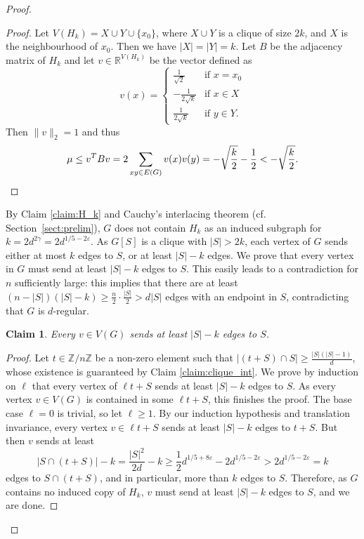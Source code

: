 \documentclass[11pt]{article}
\theoremstyle{plain}
\newtheorem{claim}[theorem]{Claim}
\theoremstyle{definition}
\newcommand{\eps}{\varepsilon}
\begin{document}
\begin{proof}
    \begin{proof}
        Let $V(H_k)=X\cup Y\cup \{x_0\}$, where $X\cup Y$ is a clique of size $2k$, and $X$ is the neighbourhood of $x_0$. Then we have $|X|=|Y|=k$. Let $B$ be the adjacency matrix of $H_k$ and let $v\in \mathbb{R}^{V(H_k)}$ be the vector defined as 
        $$v(x)=\begin{cases} \frac{1}{\sqrt{2}}  &\mbox{if } x=x_0\\
        -\frac{1}{2\sqrt{k}} &\mbox{if } x\in X\\
        \frac{1}{2\sqrt{k}}  &\mbox{if } y\in Y.\end{cases}$$
        Then $\|v\|_2=1$ and thus \[\mu\leq v^TBv=2\sum_{xy\in E(G)}v(x)v(y)=-\sqrt{\frac{{k}}{2}}-\frac{1}{2}<-\sqrt{\frac{k}{2}}.\hfill \qedhere\]
    \end{proof}
    
    By Claim \ref{claim:H_k} and Cauchy's interlacing theorem (cf. Section~\ref{sect:prelim}), $G$ does not contain $H_k$ as an induced subgraph for $k=2d^{2\gamma}=2d^{1/5-2\eps}$.
    As $G[S]$ is a clique with $|S|> 2k$, each vertex of $G$ sends either at most $k$ edges to $S$, or at least $|S|-k$ edges. We prove that every vertex in $G$ must send at least $|S|-k$ edges to $S$. This easily leads to a contradiction for $n$ sufficiently large: this implies that there are at least $(n-|S|)(|S|-k)\geq \frac{n}{2}\cdot \frac{|S|}{2} > d|S|$ edges with an endpoint in $S$, contradicting that $G$ is $d$-regular.
    
    \begin{claim}\label{claim:chowla_2}
        Every $v\in V(G)$ sends at least $|S|-k$ edges to $S$.
    \end{claim}
    
    \begin{proof}
        Let $t\in \mathbb{Z}/n\mathbb{Z}$ be a non-zero element such that $|(t+S)\cap S|\geq \frac{|S|(|S|-1)}{d}$, whose existence is guaranteed by Claim \ref{claim:clique_int}. We prove by induction on $\ell$ that every vertex of $\ell t+S$ sends at least $|S|-k$ edges to $S$. As every vertex $v\in V(G)$ is contained in some $\ell t+S$, this finishes the proof. The base case $\ell=0$ is trivial, so let $\ell\geq 1$. By our induction hypothesis and translation invariance, every vertex $v\in \ell t+S$ sends at least $|S|-k$ edges to $t+S$. But then $v$ sends at least 
        $$|S\cap (t+S)|-k=\frac{|S|^2}{2d}-k\geq \frac{1}{2}d^{1/5+8\eps}-2d^{1/5-2\eps}>2d^{1/5-2\eps}=k$$ edges to $S\cap (t+S)$, and in particular, more than $k$ edges to $S$. Therefore, as $G$ contains no induced copy of $H_k$, $v$ must send at least $|S|-k$ edges to $S$, and we are done. 
    \end{proof}
\end{proof}
\end{document}
